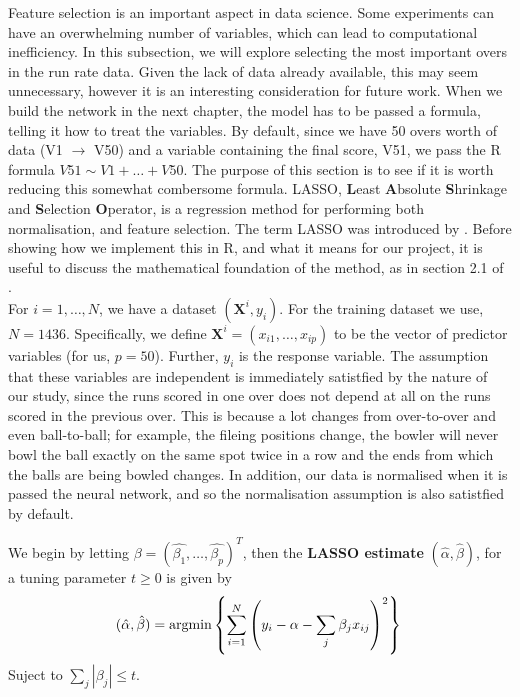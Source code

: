 Feature selection is an important aspect in data science. Some experiments can have an overwhelming number of variables, which can lead to computational inefficiency. In this subsection, we will explore selecting the most important overs in the run rate data.
Given the lack of data already available, this may seem unnecessary, however it is an interesting consideration for future work. When we build the network in the next chapter, the model has to be passed a formula, telling it how to treat the variables. By default, since we have 50 overs worth of data (V1 $\rightarrow$ V50) and a variable containing the final score, V51, we pass the R formula $V51 \sim V1 + \ldots + V50$. The purpose of this section is to see if it is worth reducing this somewhat combersome formula. 
LASSO, \textbf{L}east \textbf{A}bsolute \textbf{S}hrinkage and \textbf{S}election \textbf{O}perator, is a regression method for performing both normalisation, and feature selection. The term LASSO was introduced by \cite{tib}. Before showing how we implement this in R, and what it means for our project, it is useful to discuss the mathematical foundation of the method, as in section 2.1 of \cite{tib}. \\

For $i=1,\ldots,N$, we have a dataset $(\textbf{X}^i,y_i)$. For the training dataset we use, $N=1436$. Specifically, we define $\textbf{X}^i = (x_{i1},\ldots,x_{ip})$ to be the vector of predictor variables (for us, $p=50$). Further, $y_i$ is the response variable. The assumption that these variables are independent is immediately satistfied by the nature of our study, since the runs scored in one over does not depend at all on the runs scored in the previous over. This is because a lot changes from over-to-over and even ball-to-ball;
for example, the fileing positions change, the bowler will never bowl the ball exactly on the same spot twice in a row and the ends from which the balls are being bowled changes.  
In addition, our data is normalised when it is passed the neural network, and so the normalisation assumption is also satistfied by default. 

\begin{definition}
    We begin by letting $\beta = (\hat{\beta_1},\ldots,\hat{\beta_p})^T$, then the \textbf{LASSO estimate} $(\hat{\alpha}, \hat{\beta})$, for a tuning parameter $t \geq 0$ is given by
    \[
        (\hat{\alpha},\hat{\beta}) = \text{argmin} \left\{ \sum_{i=1}^N \left(y_i - \alpha - \sum_j \beta_j x_{ij} \right)^2 \right\} \\
    \]
    Suject to $\sum_j |\beta_j| \leq t$. 
\end{definition}

